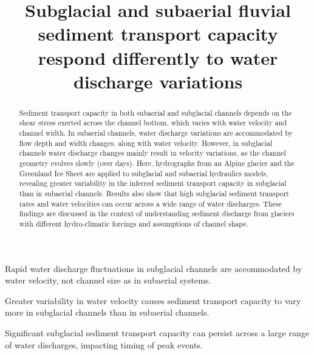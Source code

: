 \documentclass[draft]{agujournal2019}
\begin{document}
\title{Subglacial and subaerial fluvial sediment transport capacity respond differently to water discharge variations}




\begin{keypoints}
\item Rapid water discharge fluctuations in subglacial channels are accommodated by water velocity, not channel size as in subaerial systems.
\item Greater variability in water velocity causes sediment transport capacity to vary more in subglacial channels than in subaerial channels.
\item Significant subglacial sediment transport capacity can persist across a large range of water discharges, impacting  timing of peak events.
\end{keypoints}

\begin{abstract}
  Sediment transport capacity in both subaerial and subglacial channels depends on the shear stress exerted across the channel bottom, which varies with water velocity and channel width.
  In subaerial channels, water discharge variations are accommodated  by flow depth and width changes, along with water velocity.
  However, in subglacial channels  water discharge changes mainly result in velocity variations, as the channel geometry evolves slowly (over days).
  Here, hydrographs from an Alpine glacier and the Greenland Ice Sheet are applied to subglacial and subaerial hydraulics models, revealing greater variability in the inferred sediment transport capacity in subglacial than in subaerial channels.
  Results also show that high subglacial sediment transport rates and water velocities can occur across a wide range of water discharges.
  These findings are discussed in the context of understanding sediment discharge from glaciers with different hydro-climatic forcings and assumptions of channel shape.
\end{abstract}
\end{document}

